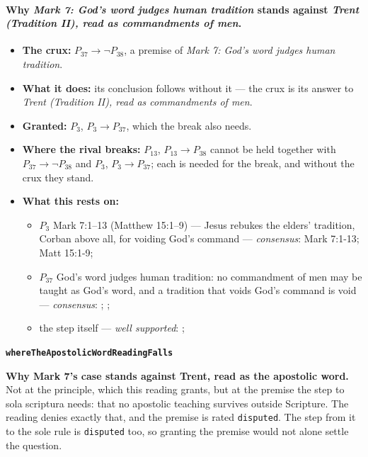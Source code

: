\documentclass[11pt]{article}
\begin{document}
\paragraph{Why \emph{Mark 7: God's word judges human tradition} stands against \emph{Trent (Tradition II), read as commandments of men}.}
\begin{itemize}
\item \textbf{The crux:} \(P_{37} \rightarrow \lnot P_{38}\), a premise of \emph{Mark 7: God's word judges human tradition}.
\item \textbf{What it does:} its conclusion follows without it --- the crux is its answer to \emph{Trent (Tradition II), read as commandments of men}.
\item \textbf{Granted:} \(P_{3}\), \(P_{3} \rightarrow P_{37}\), which the break also needs.
\item \textbf{Where the rival breaks:} \(P_{13}\), \(P_{13} \rightarrow P_{38}\) cannot be held together with \(P_{37} \rightarrow \lnot P_{38}\) and \(P_{3}\), \(P_{3} \rightarrow P_{37}\); each is needed for the break, and without the crux they stand.
\item \textbf{What this rests on:}
\begin{itemize}
\item \(P_{3}\) Mark 7:1–13 (Matthew 15:1–9) — Jesus rebukes the elders' tradition, Corban above all, for voiding God's command --- \emph{consensus}: Mark 7:1-13; Matt 15:1-9; \cite[IV.x.10]{calvin-institutes-1960}
\item \(P_{37}\) God's word judges human tradition: no commandment of men may be taught as God's word, and a tradition that voids God's command is void --- \emph{consensus}: \cite[Vatican II (1965), Dei Verbum 10]{tanner-decrees-1990}; \cite[IV.x.23]{calvin-institutes-1960}; \cite{florovsky-bible-church-tradition-1972}
\item the step itself --- \emph{well supported}: \cite[Vatican II (1965), Dei Verbum 10]{tanner-decrees-1990}; \cite[IV.x.23]{calvin-institutes-1960}
\end{itemize}
\end{itemize}
\par\medskip\noindent\textbf{\texttt{where\allowbreak{}The\allowbreak{}Apostolic\allowbreak{}Word\allowbreak{}Reading\allowbreak{}Falls}}\par\nobreak\noindent
\textbf{Why Mark 7's case stands against Trent, read as the apostolic word.} Not at the principle, which this reading grants, but at the premise the step to sola scriptura needs: that no apostolic teaching survives outside Scripture. The reading denies exactly that, and the premise is rated \texttt{disputed}. The step from it to the sole rule is \texttt{disputed} too, so granting the premise would not alone settle the question.
\end{document}
